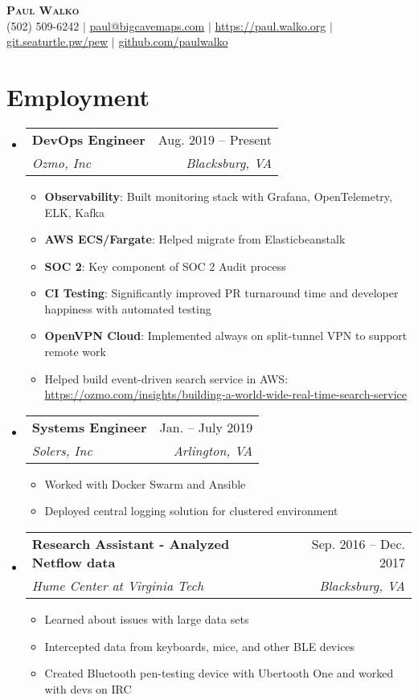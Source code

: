 \documentclass[letterpaper,12pt]{article}
\makeatletter
\newcommand{\resumeItem}[1]{
  \item\small{
    {#1 \vspace{-2pt}}
  }
}
\newcommand{\resumeSubheading}[4]{
  \vspace{-2pt}\item
    \begin{tabular*}{0.97\textwidth}[t]{l@{\extracolsep{\fill}}r}
      \textbf{#1} & #2 \\
      \textit{\small#3} & \textit{\small #4} \\
    \end{tabular*}\vspace{-7pt}
}
\newcommand{\resumeSubHeadingListStart}{\begin{itemize}[leftmargin=0.15in, label={}]}
\newcommand{\resumeSubHeadingListEnd}{\end{itemize}}
\newcommand{\resumeItemListStart}{\begin{itemize}}
\newcommand{\resumeItemListEnd}{\end{itemize}\vspace{-5pt}}
\makeatother
\begin{document}
\begin{center}
    \textbf{\Huge \scshape Paul Walko} \\ \vspace{1pt}
    \small (502) 509-6242 $|$ \href{mailto:paul@bigcavemaps.com}{paul@bigcavemaps.com} $|$ 
    \href{https://paul.walko.org}{https://paul.walko.org} $|$
    \href{https://git.seaturtle.pw/pew}{git.seaturtle.pw/pew} $|$ \href{https://github.com/paulwalko}{github.com/paulwalko}
\end{center}





\section{Employment}
  \resumeSubHeadingListStart
    \resumeSubheading
      {DevOps Engineer} {Aug. 2019 -- Present}
      {Ozmo, Inc}{Blacksburg, VA}
      \resumeItemListStart
	    \resumeItem{\textbf{Observability}: Built monitoring stack with Grafana, OpenTelemetry, ELK, Kafka}
      	\resumeItem{\textbf{AWS ECS/Fargate}: Helped migrate from Elasticbeanstalk}
      	\resumeItem{\textbf{SOC 2}: Key component of SOC 2 Audit process}
        \resumeItem{\textbf{CI Testing}: Significantly improved PR turnaround time and developer happiness with automated testing}
        \resumeItem{\textbf{OpenVPN Cloud}: Implemented always on split-tunnel VPN to support remote work}
        \resumeItem{Helped build event-driven search service in AWS: \\ \href{https://ozmo.com/insights/building-a-world-wide-real-time-search-service/}{https://ozmo.com/insights/building-a-world-wide-real-time-search-service}}
      \resumeItemListEnd

    \resumeSubheading
      {Systems Engineer }{Jan. -- July 2019}
      {Solers, Inc}{Arlington, VA}
      \resumeItemListStart
        \resumeItem{Worked with Docker Swarm and Ansible}
        \resumeItem{Deployed central logging solution for clustered environment}
      \resumeItemListEnd

    \resumeSubheading
      {Research Assistant - Analyzed Netflow data} {Sep. 2016 -- Dec. 2017}
      {Hume Center at Virginia Tech}{Blacksburg, VA}
      \resumeItemListStart
        \resumeItem{Learned about issues with large data sets}
        \resumeItem{Intercepted data from keyboards, mice, and other BLE devices}
        \resumeItem{Created Bluetooth pen-testing device with Ubertooth One and worked with devs on IRC}
      \resumeItemListEnd
  \resumeSubHeadingListEnd
\end{document}
